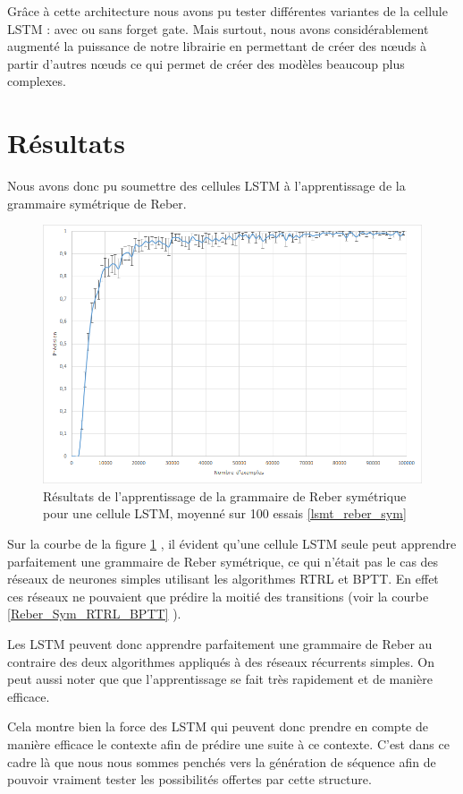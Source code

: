 Grâce à cette architecture nous avons pu tester différentes variantes de la cellule LSTM : avec ou sans forget gate. Mais surtout, nous avons considérablement augmenté la puissance de notre librairie en permettant de créer des n\oe{}uds à partir d'autres n\oe{}uds ce qui permet de créer des modèles beaucoup plus complexes.

\section{Résultats}

Nous avons donc pu soumettre des cellules LSTM à l'apprentissage de la grammaire symétrique de Reber. 

\begin{figure}[h!]
\begin{center}
\includegraphics[scale=0.5]{images/chapter6/LSTM_Reber_Sym.png}
\caption{Résultats de l'apprentissage de la grammaire de Reber symétrique pour une cellule LSTM, moyenné sur 100 essais
\ref{lsmt_reber_sym}}
\label{Reber_Sym_LSTM}
\end{center}
\end{figure}

Sur la courbe de la figure \ref{Reber_Sym_LSTM} , il évident qu'une cellule LSTM seule peut apprendre parfaitement une grammaire de Reber symétrique, ce qui n'était pas le cas des réseaux de neurones simples utilisant les algorithmes RTRL et BPTT. En effet ces réseaux ne pouvaient que prédire la moitié des transitions (voir la courbe \ref{Reber_Sym_RTRL_BPTT} ).

Les LSTM peuvent donc apprendre parfaitement une grammaire de Reber au contraire des deux algorithmes appliqués à des réseaux récurrents simples. On peut aussi noter que que l'apprentissage se fait très rapidement et de manière efficace. 

Cela montre bien la force des LSTM qui peuvent donc prendre en compte de manière efficace le contexte afin de prédire une suite à ce contexte. C'est dans ce cadre là que nous nous sommes penchés vers la génération de séquence afin de pouvoir vraiment tester les possibilités offertes par cette structure.